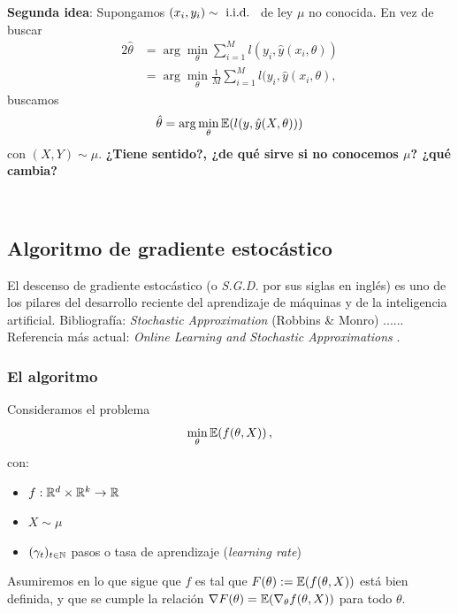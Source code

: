 \begin{example}
\begin{itemize}
\end{itemize}
\textbf{Segunda idea}: Supongamos $(x_i,y_i)\sim\mbox{ i.i.d. }$ de ley $\mu$ no conocida.
\newline En vez de buscar
\begin{alignat*}{2}
        \hat{\theta} & = \displaystyle\arg\min_\theta\sum^M_{i=1}l(y_i,\hat{y}(x_i,\theta)) \\
         & = \arg\min_\theta \frac{1}{M}\sum^M_{i=1}l(y_i,\hat{y}(x_i,\theta), 
    \end{alignat*}
buscamos
$$ \hat{\theta}=\displaystyle\arg\min_\theta \mathbb{E}(l(y,\hat{y}(X,\theta)))$$
con $(X,Y)\sim\mu$.
\newp \textbf{¿Tiene sentido?, ¿de qué sirve si no conocemos $\mu$? ¿qué cambia?}
\end{example}
\vspace{1cm}\\
\subsection{Algoritmo de gradiente estocástico}
El descenso de gradiente estocástico (o \textit{S.G.D.} por sus siglas en inglés) es uno de los pilares del desarrollo reciente del aprendizaje de máquinas y de la inteligencia artificial.
\newp Bibliografía: \textit{Stochastic Approximation} (Robbins \& Monro) \cite{robbins}...... Referencia m\'as actual: \textit{Online Learning and Stochastic Approximations} \cite{bottou}.

\subsubsection{El algoritmo}
Consideramos el problema
$$ \min_\theta \mathbb{E}(f(\theta,X)) \, ,$$
con:
\begin{itemize}
\item $f:\mathbb{R}^d\times \mathbb{R}^k\to\mathbb{R}$
    \item $X\sim\mu$
    \item $(\gamma_t)_{t\in\mathbb{N}}$ pasos o tasa de aprendizaje (\textit{learning rate})
\end{itemize}
 Asumiremos en lo que sigue que $f$ es tal que $F(\theta):= \mathbb{E}(f(\theta,X))$ est\'a bien definida, y que se cumple la relaci\'on $\nabla F(\theta)=\mathbb{E}(\nabla_\theta f(\theta,X)) $ para todo $\theta$.
 
